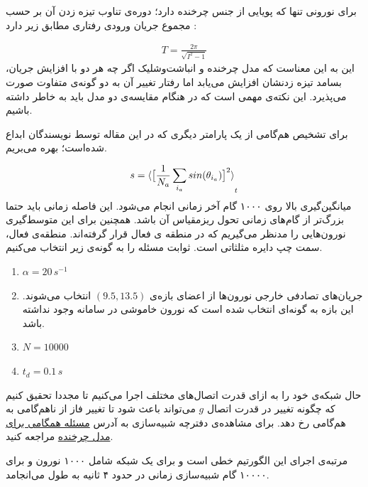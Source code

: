 برای نورونی تنها که پویایی از جنس چرخنده دارد؛ دوره‌ی تناوب تیزه زدن آن بر حسب مجموع جریان ورودی‌ رفتاری مطابق زیر دارد \cite{safaeesirat2020critical}:

\begin{align}
	T = \frac{2\pi}{\sqrt{I^2 - 1}}
\end{align}
این به این معناست که مدل چرخنده و انباشت‌وشلیک اگر چه هر دو با افزایش جریان، بسامد تیزه زدنشان افزایش می‌یابد اما رفتار تغییر آن به دو گونه‌ی متفاوت صورت می‌پذیرد. این نکته‌ی مهمی است که در هنگام مقایسه‌ی دو مدل باید به خاطر داشته باشیم.

برای تشخیص هم‌گامی از یک پارامتر دیگری که در این مقاله \cite{safaeesirat2020critical}  توسط نویسندگان ابداع شده‌است؛ بهره می‌بریم.

\begin{equation}
	s =  \braket{ \big[ \frac{1}{N_a}\sum_{i_a} sin(\theta_{i_a}) \big]^{2}}_t
	\label{eq:saman_amin_param}
\end{equation}
میانگین‌گیری بالا روی ۱۰۰۰ گام آخر زمانی انجام می‌شود. این فاصله زمانی باید حتما بزرگ‌تر از گام‌های زمانی تحول ریزمقیاس آن باشد. همچنین برای این متوسط‌گیری نورون‌هایی را مدنظر می‌گیریم که در منطقه ی فعال قرار گرفته‌اند. منطقه‌ی فعال، سمت چپ دایره مثلثاتی است.
ثوابت مسئله را به گونه‌ی زیر انتخاب می‌کنیم.
\begin{tcolorbox}[colback=green!5!white,colframe=green!75!black]
	\begin{enumerate}[*]
		\item
		$\alpha = 20\, s^{-1}$
		\item
		جریان‌های تصادفی خارجی نورون‌ها از اعضای بازه‌ی $(9.5,13.5)$ انتخاب می‌شوند. این بازه به گونه‌ای انتخاب شده است که نورون خاموشی در سامانه وجود نداشته باشد.
		\item
		$N = 10000$
		\item
		$t_d = 0.1\, s$ 
	\end{enumerate}
\end{tcolorbox}
حال شبکه‌ی خود را به ازای قدرت اتصال‌های مختلف اجرا می‌کنیم تا مجددا تحقیق کنیم که چگونه تغییر در قدرت اتصال $g$ می‌تواند باعث شود تا تغییر فاز از ناهم‌گامی به هم‌گامی رخ دهد. برای مشاهده‌ی دفترچه شبیه‌سازی به آدرس 
\href{run://..//scripts//rotational_model}{مسئله همگامی برای مدل چرخنده}
مراجعه کنید.

مرتبه‌ی اجرای این الگورتیم خطی است و برای یک شبکه شامل ۱۰۰۰ نورون و برای ۱۰۰۰۰ گام شبیه‌سازی زمانی در حدود ۴ ثانیه به طول می‌انجامد. 


